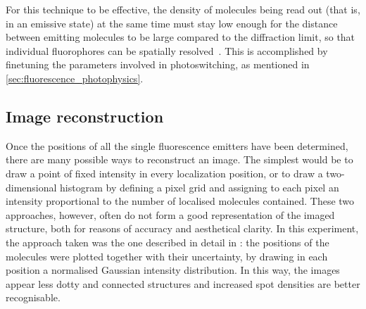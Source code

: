 For this technique to be effective, the density of molecules being read out
(that is, in an emissive state) at the same time must stay low
enough for the distance between emitting molecules to be large
compared to the diffraction limit, so that individual fluorophores
can be spatially \mbox{resolved \cite{furstenberg_single-molecule_2013}}.
This is accomplished by finetuning the parameters involved in photoswitching, as mentioned in \autoref{sec:fluorescence_photophysics}.


\subsection{Image reconstruction}
Once the positions of all the single fluorescence emitters have been determined, there are many possible ways to reconstruct an image.
The simplest would be to draw a point of fixed intensity in every localization position, or to draw a two-dimensional histogram by defining a pixel grid and assigning to each pixel an intensity proportional to the number of localised molecules contained.
These two approaches, however, often do not form a good representation of the imaged structure, both for reasons of accuracy and aesthetical clarity.
In this experiment, the approach taken was the one described in detail in \cite{martens_raw_2022}:
the positions of the molecules were plotted together with their uncertainty, by drawing in each position a normalised Gaussian intensity distribution.
In this way, the images appear less dotty and connected structures and increased spot densities are better recognisable.


